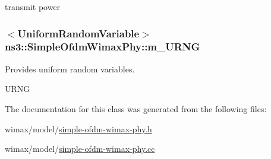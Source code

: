 transmit power 

\subsubsection[{\texorpdfstring{m\+\_\+\+U\+R\+NG}{m_URNG}}]{$<${\bf Uniform\+Random\+Variable}$>$ ns3\+::\+Simple\+Ofdm\+Wimax\+Phy\+::m\+\_\+\+U\+R\+NG\hspace{0.3cm}{\ttfamily [private]}}\hypertarget{classns3_1_1SimpleOfdmWimaxPhy_a4cf477c7c9eed77333bd5833cc3ba6d3}{}\label{classns3_1_1SimpleOfdmWimaxPhy_a4cf477c7c9eed77333bd5833cc3ba6d3}


Provides uniform random variables. 

U\+R\+NG 

The documentation for this class was generated from the following files\+:\begin{DoxyCompactItemize}
\item 
wimax/model/\hyperlink{simple-ofdm-wimax-phy_8h}{simple-\/ofdm-\/wimax-\/phy.\+h}\item 
wimax/model/\hyperlink{simple-ofdm-wimax-phy_8cc}{simple-\/ofdm-\/wimax-\/phy.\+cc}\end{DoxyCompactItemize}
